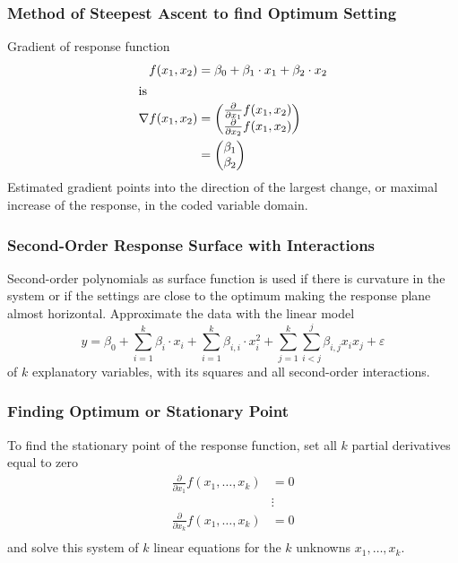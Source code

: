 \documentclass[11pt]{article}
\theoremstyle{definition}
\begin{document}
\subsubsection{Method of Steepest Ascent to find Optimum Setting}
Gradient of response function
\begin{align*}
	f(x_1, x_2) &= \beta_0 + \beta_1\cdot x_1 + \beta_2\cdot x_2\\
	\intertext{is}
	\nabla f(x_1, x_2) &= \begin{pmatrix}
		\frac{\partial}{\partial x_1}f(x_1, x_2)\\
		\frac{\partial}{\partial x_2}f(x_1, x_2)
	\end{pmatrix}\\
	&= \begin{pmatrix}
		\beta_1\\
		\beta_2
	\end{pmatrix}
\end{align*}
Estimated gradient points into the direction of the largest change, or maximal increase of the response, in the coded variable domain.

\subsubsection{Second-Order Response Surface with Interactions}
Second-order polynomials as surface function is used if there is curvature in the system or if the settings are close to the optimum making the response plane almost horizontal. Approximate the data with the linear model
\begin{equation*}
	y = \beta_0 + \sum_{i=1}^k\beta_i\cdot x_i + \sum_{i=1}^{k}\beta_{i,i}\cdot x_i^2 + \sum_{j=1}^k\sum_{i<j}^j\beta_{i,j}x_i x_j + \varepsilon
\end{equation*}
of $k$ explanatory variables, with its squares and all second-order interactions.

\subsubsection{Finding Optimum or Stationary Point}
To find the stationary point of the response function, set all $k$ partial derivatives equal to zero
\begin{align*}
	\frac{\partial}{\partial x_1}f(x_1,\dots,x_k) &= 0\\
	&\vdots\\
	\frac{\partial}{\partial x_k}f(x_1,\dots,x_k) &= 0\\
\end{align*}
and solve this system of $k$ linear equations for the $k$ unknowns $x_1,\dots,x_k$.
\end{document}
